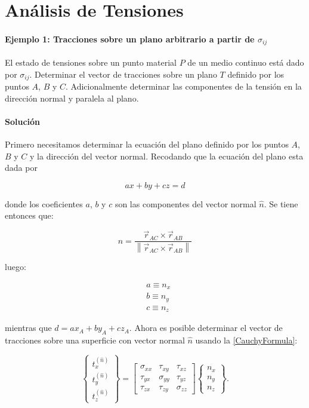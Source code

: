 \documentclass[../notas medios.tex]{subfiles}
\begin{document}
\chapter{Análisis de Tensiones}

\graphicspath{{IMAGES/Cap3/}} 								 %



\subsubsection*{Ejemplo 1: Tracciones sobre un plano arbitrario a partir de $\sigma_{ij}$}
El estado de tensiones sobre un punto material $P$ de un medio continuo está
dado por $\sigma_{ij}$. Determinar el vector de tracciones sobre un plano $T$
definido por los puntos $A$, $B$ y $C$. Adicionalmente determinar las
componentes de la tensión en la dirección normal y paralela al plano.
\subsubsection*{Solución}
Primero necesitamos determinar la ecuación del plano definido por los puntos $A$, $B$ y $C$ y la dirección del vector normal. Recodando que la ecuación del plano esta dada por

\[ax+by+cz=d\]

donde los coeficientes $a$, $b$ y $c$ son las componentes del vector normal $\hat{n}$. Se tiene entonces que:

\[\hat n = \frac{{{{\vec r}_{AC}} \times {{\vec r}_{AB}}}}{{\left\| {{{\vec r}_{AC}} \times {{\vec r}_{AB}}} \right\|}}\]

luego:

\begin{align*}
&a \equiv {n_x}\\
&b \equiv {n_y}\\
&c \equiv {n_z}
\end{align*}

mientras que $d=a x_A+b y_A+c z_A$. Ahora es posible determinar el vector de tracciones sobre una superficie con vector normal $\hat{n}$ usando la \cref{CauchyFormula}:


\[
\left\{ {\begin{array}{*{20}{c}}
{t_x^{(\hat n)}}\\
{t_y^{(\hat n)}}\\
{t_z^{(\hat n)}}
\end{array}} \right\} = \left[ {\begin{array}{*{20}{c}}
{{\sigma _{xx}}}&{{\tau _{xy}}}&{{\tau _{xz}}}\\
{{\tau _{yx}}}&{{\sigma _{yy}}}&{{\tau _{yz}}}\\
{{\tau _{zx}}}&{{\tau _{zy}}}&{{\sigma _{zz}}}
\end{array}} \right]\left\{ {\begin{array}{*{20}{c}}
{{n_x}}\\
{{n_y}}\\
{{n_z}}
\end{array}} \right\}.
\]
\end{document}
